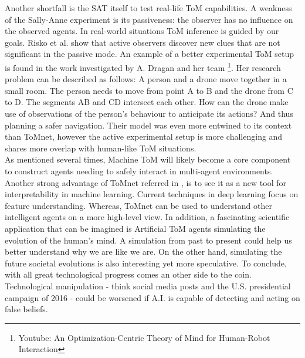 \documentclass[twocolumn,superscriptaddress,aps]{revtex4-1}
\begin{document}
\indent Another shortfall is the SAT itself to test real-life ToM capabilities. A weakness of the Sally-Anne experiment is its passiveness: the observer has no influence on the observed agents. In real-world situations ToM inference is guided by our goals. Risko et al. \cite{risko} show that active observers discover new clues that are not significant in the passive mode. An example of a better experimental ToM setup is found in the work investigated by A. Dragan and her team \footnote{Youtube: An Optimization-Centric Theory of Mind for Human-Robot Interaction}. Her research problem can be described as follows: A person and a drone move together in a small room. The person needs to move from point A to B and the drone from C to D. The segments AB and CD intersect each other. How can the drone make use of observations of the person's behaviour to anticipate its actions? And thus planning a safer navigation. Their model was even more entwined to its context than ToMnet, however the active experimental setup is more challenging and shares more overlap with human-like ToM situations. \\

\indent As mentioned several times, Machine ToM will likely become a core component to construct agents needing to safely interact in multi-agent environments. Another strong advantage of ToMnet referred in \cite{Tomnet}, is to see it as a new tool for interpretability in machine learning. Current techniques in deep learning focus on feature understanding. Whereas, ToMnet can be used to understand other intelligent agents on a more high-level view. In addition, a fascinating scientific application that can be imagined is Artificial ToM agents simulating the evolution of the human's mind. A simulation from past to present could help us better understand why we are like we are. On the other hand, simulating the future societal evolutions is also interesting yet more speculative. To conclude, with all great technological progress comes an other side to the coin. Technological manipulation - think social media posts and the U.S. presidential campaign of 2016 - could be worsened if A.I. is capable of detecting and acting on false beliefs.






\end{document}
